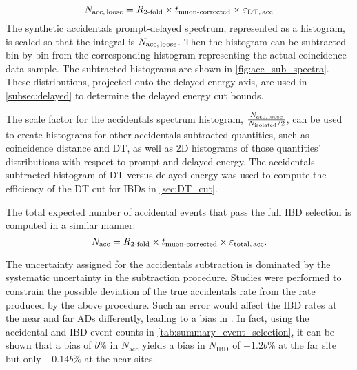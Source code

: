 \begin{equation}
    N_{\text{acc,\,loose}} = R_{\text{\ensuremath{2}-fold}} \times t_{\text{muon-corrected}}
        \times \varepsilon_{\text{DT,\,acc}}
    \label{eq:nacc_loose}
\end{equation}
The synthetic accidentals prompt-delayed spectrum, represented as a histogram,
is scaled so that the integral is $N_{\text{acc,\,loose}}$.
Then the histogram can be subtracted bin-by-bin from the corresponding histogram
representing the actual  coincidence data sample.
The subtracted histograms are shown in \cref{fig:acc_sub_spectra}.
These distributions, projected onto the delayed energy axis,
are used in \cref{subsec:delayed} to determine the delayed energy cut bounds.


The scale factor for the accidentals spectrum histogram,
$\frac{N_{\text{acc,\,loose}}}{N_{\text{isolated}}/2}$,
can be used to create histograms for other accidentals-subtracted quantities,
such as coincidence distance and DT, as well as 2D histograms of
those quantities' distributions with respect to prompt and delayed energy.
The accidentals-subtracted histogram of DT versus delayed energy
was used to compute the efficiency of the DT cut for IBDs in \cref{sec:DT_cut}.

The total expected number of accidental events
that pass the full IBD selection is computed in a similar manner:
\begin{equation}
    N_{\text{acc}} = R_{\text{\ensuremath{2}-fold}} \times t_{\text{muon-corrected}}
        \times \varepsilon_{\text{total,\,acc}}.
    \label{eq:nacc}
\end{equation}

The uncertainty assigned for the accidentals subtraction
is dominated by the systematic uncertainty in the subtraction procedure.
Studies were performed to constrain the possible deviation
of the true accidentals rate
from the rate produced by the above procedure.
Such an error would affect the IBD rates at the near and far ADs differently,
leading to a bias in \thetaot{}.
In fact, using the accidental and IBD event counts in \cref{tab:summary_event_selection},
it can be shown that a bias of $b\si{\percent}$ in $N_{\text{acc}}$
yields a bias in $N_{\text{IBD}}$ of $-1.2b\si{\percent}$ at the far site
but only $-0.14b\si{\percent}$ at the near sites.

